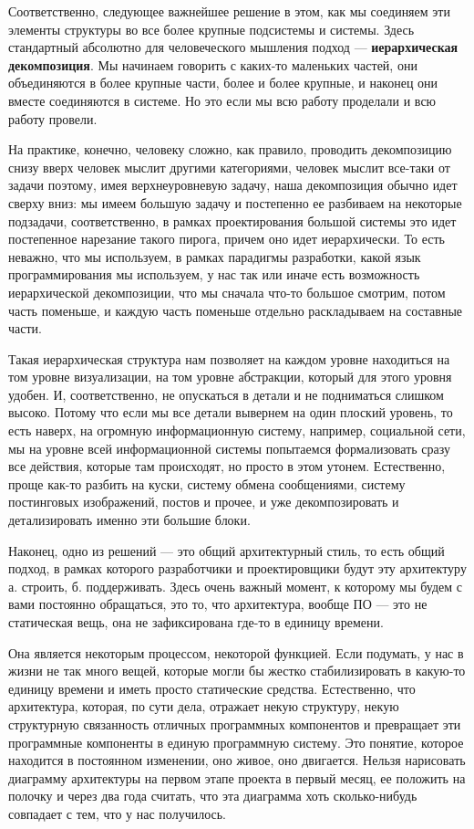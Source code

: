 Соответственно, следующее важнейшее решение в этом, как мы соединяем эти элементы структуры во все более крупные подсистемы и системы. Здесь стандартный абсолютно для человеческого мышления подход --- \textbf{иерархическая декомпозиция}. Мы начинаем говорить с каких-то маленьких частей, они объединяются в более крупные части, более и более крупные, и наконец они вместе соединяются в системе. Но это если мы всю работу проделали и всю работу провели.

На практике, конечно, человеку сложно, как правило, проводить декомпозицию снизу вверх человек мыслит другими категориями, человек мыслит все-таки от задачи поэтому, имея верхнеуровневую задачу, наша декомпозиция обычно идет сверху вниз: мы имеем большую задачу и постепенно ее разбиваем на некоторые подзадачи, соответственно, в рамках проектирования большой системы это идет постепенное нарезание такого пирога, причем оно идет иерархически. То есть неважно, что мы используем, в рамках парадигмы разработки, какой язык программирования мы используем, у нас так или иначе есть возможность иерархической декомпозиции, что мы сначала что-то большое смотрим, потом часть поменьше, и каждую часть поменьше отдельно раскладываем на составные части.

Такая иерархическая структура нам позволяет на каждом уровне находиться на том уровне визуализации, на том уровне абстракции, который для этого уровня удобен. И, соответственно, не опускаться в детали и не подниматься слишком высоко. Потому что если мы все детали вывернем на один плоский уровень, то есть наверх, на огромную информационную систему, например, социальной сети, мы на уровне всей информационной системы попытаемся формализовать сразу все действия, которые там происходят, но просто в этом утонем. Естественно, проще как-то разбить на куски, систему обмена сообщениями, систему постинговых изображений, постов и прочее, и уже декомпозировать и детализировать именно эти большие блоки.

Наконец, одно из решений --- это общий архитектурный стиль, то есть общий подход, в рамках которого разработчики и проектировщики будут эту архитектуру а. строить, б. поддерживать. Здесь очень важный момент, к которому мы будем с вами постоянно обращаться, это то, что архитектура, вообще ПО --- это не статическая вещь, она не зафиксирована где-то в единицу времени.

Она является некоторым процессом, некоторой функцией. Если подумать, у нас в жизни не так много вещей, которые могли бы жестко стабилизировать в какую-то единицу времени и иметь просто статические средства. Естественно, что архитектура, которая, по сути дела, отражает некую структуру, некую структурную связанность отличных программных компонентов и превращает эти программные компоненты в единую программную систему. Это понятие, которое находится в постоянном изменении, оно живое, оно двигается. Нельзя нарисовать диаграмму архитектуры на первом этапе проекта в первый месяц, ее положить на полочку и через два года считать, что эта диаграмма хоть сколько-нибудь совпадает с тем, что у нас получилось.

